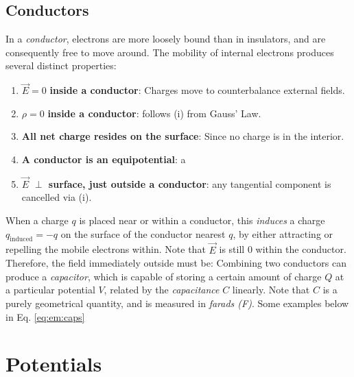 \subsection{Conductors}
In a \textit{conductor}, electrons are more loosely bound than in insulators, and are consequently free to move around. The mobility of internal electrons produces several distinct properties:
\begin{enumerate}[label=(\roman*)]
	\item $\vec{E}=0$ \textbf{inside a conductor}: Charges move to counterbalance external fields.
	\item $\rho = 0$ \textbf{inside a conductor}: follows (i) from Gauss' Law.
	\item \textbf{All net charge resides on the surface}: Since no charge is in the interior.
	\item \textbf{A conductor is an equipotential}: a
	\item $\vec{E}$ \textbf{$\perp$ surface, just outside a conductor}: any tangential component is cancelled via (i).
\end{enumerate} 
When a charge $q$ is placed near or within a conductor, this \textit{induces} a charge $q_{\text{induced}}=-q$ on the surface of the conductor nearest $q$, by either attracting or repelling the mobile electrons within. Note that $\vec{E}$ is still 0 within the conductor.
Therefore, the field immediately outside must be:
Combining two conductors can produce a \textit{capacitor}, which is capable of storing a certain amount of charge $Q$ at a particular potential $V$, related by the \textit{capacitance} $C$ linearly. Note that $C$ is a purely geometrical quantity, and is measured in \textit{farads (F)}. Some examples below in Eq. \ref{eq:em:caps}

\section{Potentials}


